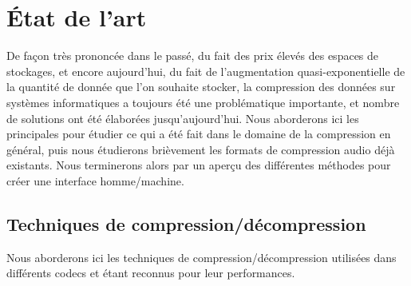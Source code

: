 \documentclass[a4paper,12pt]{article}
\begin{document}
\tableofcontents

\newpage

\section{\'Etat de l'art}
De façon  très prononcée  dans le  passé,  du fait  des prix  élevés des
espaces de stockages,  et encore aujourd'hui,  du fait de l'augmentation
quasi-exponentielle de la quantité de  donnée que l'on souhaite stocker,
la compression des données sur systèmes informatiques a toujours été une
problématique  importante,  et nombre  de  solutions  ont  été élaborées
jusqu'aujourd'hui.  Nous aborderons ici les  principales pour étudier ce
qui a été fait dans le  domaine de la compression en général,  puis nous
étudierons brièvement  les formats de compression  audio déjà existants.
Nous terminerons alors par un aperçu des différentes méthodes pour créer
une interface homme/machine.

	\subsection{Techniques de compression/décompression}
Nous   aborderons  ici   les  techniques   de  compression/décompression
utilisées   dans  différents   codecs  et   étant  reconnus   pour  leur
performances.

\newpage
\end{document}
